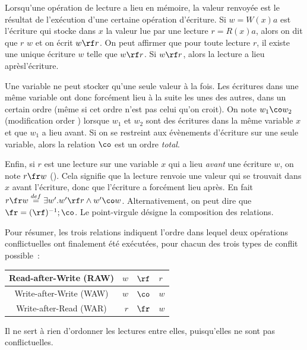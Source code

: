 \medskip

Lorsqu'une opération de lecture a lieu en mémoire, la valeur renvoyée est le
résultat de l'exécution d'une certaine opération d'écriture. Si $w = W(x)a$ est
l'écriture qui stocke dans $x$ la valeur lue par une lecture $r = R(x)a$, alors
on dit que $r$ \og {}\fg $w$ et on écrit $w \rf r$. On peut
affirmer que pour toute lecture $r$, il existe une unique écriture $w$ telle que
$w \rf r$. Si $w \rf r$, alors la lecture a lieu \og après\fg l'écriture.

Une variable ne peut stocker qu'une seule valeur à la fois. Les écritures dans
une même variable ont donc forcément lieu à la suite les unes des autres, dans
un certain ordre (même si cet ordre n'est pas celui qu'on croit). On note
$w_1 \co w_2$ (\og modification order \fg) lorsque $w_1$ et $w_2$ sont des écritures dans
la même variable $x$ et que $w_1$ a lieu \og avant\fg. Si on se restreint aux
évènements d'écriture sur une seule variable, alors la relation $\co$ est un
ordre \emph{total}.

Enfin, si $r$ est une lecture sur une variable $x$ qui a lieu \emph{avant} une
écriture $w$, on note $r \fr w$ (\og {}\fg). Cela signifie
que la lecture renvoie une valeur qui se trouvait dans $x$ \og avant\fg
l'écriture, donc que l'écriture a forcément lieu \og après\fg. En fait
$r \fr w \overset{\scriptsize def}{=} \exists w'. w' \rf r \wedge w' \co
w$. Alternativement, on peut dire que $\fr = (\rf)^{-1} ; \co$. Le point-virgule
désigne la composition des relations.

Pour résumer, les trois relations indiquent l'ordre dans lequel deux opérations
conflictuelles ont finalement été exécutées, pour chacun des trois types de
conflit possible~:
\begin{center}
\begin{tabular}{|c|rcl|}
  \hline
  Read-after-Write (RAW)  & $w$ & $\rf$ & $r$ \\
  \hline
  Write-after-Write (WAW) & $w$ & $\co$ & $w$ \\
  \hline
  Write-after-Read (WAR)  & $r$ & $\fr$ & $w$ \\
  \hline
\end{tabular}
\end{center}

Il ne sert à rien d'ordonner les lectures entre elles, puisqu'elles ne sont pas
conflictuelles. %

